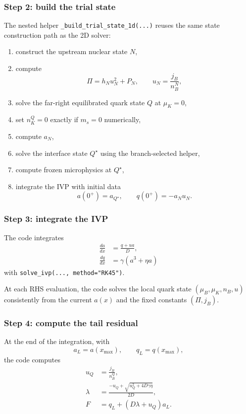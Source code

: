 \documentclass[11pt]{article}
\begin{document}
\subsubsection*{Step 2: build the trial state}
The nested helper \texttt{\_build\_trial\_state\_1d(...)} reuses the same state
construction path as the 2D solver:
\begin{enumerate}[leftmargin=1.5em]
\item construct the upstream nuclear state $N$,
\item compute
      \[
      \Pi = h_N u_N^2 + P_N, \qquad u_N = \frac{j_B}{n_B^N},
      \]
\item solve the far-right equilibrated quark state $Q$ at $\mu_K=0$,
\item set $n_K^Q = 0$ exactly if $m_s = 0$ numerically,
\item compute $a_N$,
\item solve the interface state $Q^\star$ using the branch-selected helper,
\item compute frozen microphysics at $Q^\star$,
\item integrate the IVP with initial data
      \[
      a(0^+) = a_{Q^\star}, \qquad q(0^+) = -a_N u_N.
      \]
\end{enumerate}

\subsubsection*{Step 3: integrate the IVP}
The code integrates
\begin{align}
\frac{da}{dx} &= \frac{q + u a}{D}, \\
\frac{dq}{dx} &= \gamma(a^3 + \eta a)
\end{align}
with \texttt{solve\_ivp(..., method="RK45")}.

At each RHS evaluation, the code solves the local quark state
$(\mu_B,\mu_K,n_B,u)$ consistently from the current $a(x)$ and the fixed
constants $(\Pi,j_B)$.

\subsubsection*{Step 4: compute the tail residual}
At the end of the integration, with
\[
a_L = a(x_{\max}), \qquad q_L = q(x_{\max}),
\]
the code computes
\begin{align}
u_Q &= \frac{j_B}{n_B^Q}, \\
\lambda &=
\frac{-u_Q + \sqrt{u_Q^2 + 4 D \gamma \eta}}{2 D}, \\
F &= q_L + (D \lambda + u_Q) a_L.
\end{align}
\end{document}
